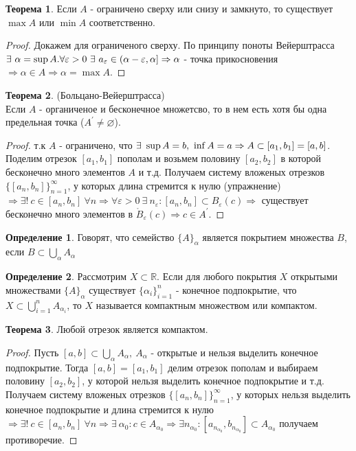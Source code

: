 \documentclass[a4paper, 12pt]{article}
\newcommand{\R}{\mathbb{R}}
\renewcommand{\epsilon}{\varepsilon}
\renewcommand{\emptyset}{\varnothing}
\theoremstyle{definition}
\newtheorem*{definition}{Определение}
\newtheorem*{theorem}{Теорема}
\begin{document}
        \begin{theorem}
            Если $A$ - ограничено сверху или снизу и замкнуто, то существует $\max{A}$ или $\min{A}$ соответственно.
        \end{theorem} 
        \begin{proof}
            Докажем для ограниченого сверху. По принципу поноты Вейерштрасса $\exists\ \alpha=\sup{A}.\\ \forall\epsilon>0\ \exists\ a_{\epsilon}\in (\alpha-\epsilon, \alpha]\Rightarrow \alpha$ - точка прикосновения $\Rightarrow \alpha \in A\Rightarrow \alpha=\max{A}$.
        \end{proof}
        \begin{theorem} (Больцано-Вейерштрасса)\\
            Если $A$ - органиченое и бесконечное множетсво, то в нем есть хотя бы одна предельная точка ($A^{\prime}\ne \emptyset$).
        \end{theorem} 
        \begin{proof}
            т.к $A$ - ограничено, что $\exists\ \sup{A}=b,\ \inf{A}=a\\ \Rightarrow A\subset [a_1,b_1] = [a,b]$. Поделим отрезок $[a_1,b_1]$ пополам и возьмем половину $[a_2,b_2]$ в которой бесконечно много элементов $A$ и т.д. Получаем систему вложеных отрезков $\{[a_n,b_n]\}_{n=1}^{\infty}$, у которых длина стремится к нулю (упражнение) $\Rightarrow \exists!\ c\in [a_n,b_n]\ \forall n\Rightarrow \forall \epsilon>0\ \exists\ n_{\epsilon}: [a_n,b_n]\subset B_{\epsilon}(c) \Rightarrow$ существует бесконечно много элементов в $\mathring{B}_{\epsilon}(c)\Rightarrow c\in A^{\prime}$.
        \end{proof}
        \begin{definition}
            Говорят, что семейство $\{A\}_{\alpha}$ является покрытием множества $B$, если $B\subset \bigcup\limits_{\alpha}A_{\alpha}$
        \end{definition} 
        \begin{definition}
            Рассмотрим $X\subset \R$. Если для любого покрытия $X$ открытыми множествами $\{A\}_{\alpha}$ существует $\{\alpha_i\}_{i=1}^n$ - конечное подпокрытие, что $X\subset \bigcup\limits_{i=1}^n A_{\alpha_i}$, то $X$ называется компактным множеством или компактом.
        \end{definition} 
        \begin{theorem}
            Любой отрезок является компактом.
        \end{theorem} 
        \begin{proof}
            Пусть $[a,b]\subset \bigcup\limits_{\alpha}A_{\alpha},\ A_{\alpha}$ - открытые и нельзя выделить конечное подпокрытие. Тогда $[a,b]=[a_1,b_1]$ делим отрезок пополам и выбираем половину $[a_2,b_2]$, у которой нельзя выделить конечное подпокрытие и т.д. Получаем систему вложеных отрезков $\{[a_n,b_n]\}_{n=1}^{\infty}$, у которых нельзя выделить конечное подпокрытие и длина стремится к нулю $\Rightarrow \exists!\ c\in [a_n,b_n]\ \forall n \Rightarrow \exists\ \alpha_0: c\in A_{\alpha_0}\Rightarrow \exists n_{\alpha_0}: [a_{n_{\alpha_0}},b_{n_{\alpha_0}}]\subset A_{\alpha_0}$ получаем противоречие.
        \end{proof} 
\end{document}
